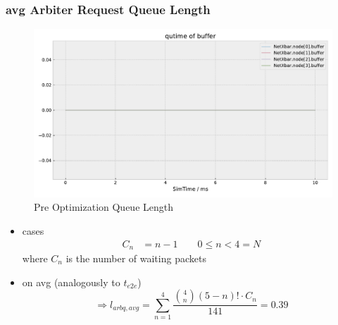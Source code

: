 \documentclass[]{scrartcl}
\begin{document}
    \subsubsection{avg Arbiter Request Queue Length}
    \begin{figure}[H]
        \centering
        \includegraphics[width=\columnwidth, page=4]{../../python/results/preopt-General-0}
        \caption{Pre Optimization Queue Length}%
        \label{fig:postopt-General-0}
    \end{figure}
        \begin{itemize}
            \item cases
                \begin{align}
                    C_n &= n-1 \qquad 0\leq n<4=N
                \end{align}
                where $C_n$ is the number of waiting packets
            \item on avg (analogously to $t_{e2e}$)
                \begin{equation}
                    \Rightarrow l_{arbq,avg} = \sum_{n=1}^4 \frac{\binom{4}{n}\left( 5-n \right)! \cdot C_n }{141} = 0.39
                \end{equation}
        \end{itemize}
\end{document}
